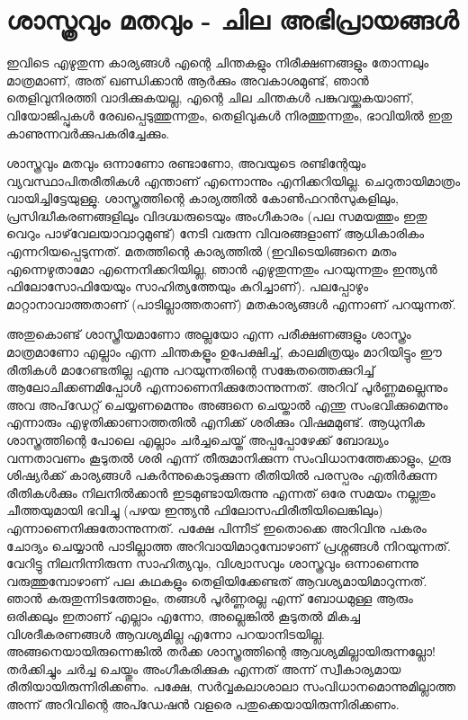 \section*{ശാസ്ത്രവും മതവും - ചില അഭിപ്രായങ്ങള്‍}
\vskip 2pt

ഇവിടെ എഴുതുന്ന കാര്യങ്ങള്‍ എന്റെ ചിന്തകളും നിരീക്ഷണങ്ങളും തോന്നലും മാത്രമാണ്, അത് ഖണ്ഡിക്കാന്‍ ആര്‍ക്കും അവകാശമുണ്ട്, ഞാന്‍ തെളിവുനിരത്തി വാദിക്കുകയല്ല, എന്റെ ചില ചിന്തകള്‍ പങ്കുവയ്ക്കുകയാണ്, വിയോജിപ്പുകള്‍ രേഖപ്പെടുത്തുന്നതും, തെളിവുകള്‍ നിരത്തുന്നതും, ഭാവിയില്‍ ഇതു കാണുന്നവര്‍ക്കുപകരിച്ചേക്കും.

ശാസ്ത്രവും മതവും ഒന്നാണോ രണ്ടാണോ, അവയുടെ രണ്ടിന്റേയും വ്യവസ്ഥാപിതരീതികള്‍ എന്താണ് എന്നൊന്നും എനിക്കറിയില്ല. ചെറുതായിമാത്രം വായിച്ചിട്ടേയുള്ളു. ശാസ്ത്രത്തിന്റെ കാര്യത്തില്‍ കോണ്‍ഫറന്‍സുകളിലും, പ്രസിദ്ധീകരണങ്ങളിലും വിദഗ്ദ്ധരുടെയും അംഗീകാരം (പല സമയത്തും ഇതു വെറും പാഴ്‌വേലയാവാറുമുണ്ട്) നേടി വരുന്ന വിവരങ്ങളാണ് ആധികാരികം എന്നറിയപ്പെടുന്നത്. മതത്തിന്റെ കാര്യത്തില്‍ (ഇവിടെയിങ്ങനെ മതം എന്നെഴുതാമോ എന്നെനിക്കറിയില്ല, ഞാന്‍ എഴുതുന്നതും പറയുന്നതും ഇന്ത്യന്‍ ഫിലോസോഫിയേയും സാഹിത്യത്തേയും കുറിച്ചാണ്). പലപ്പോഴും മാറ്റാനാവാത്തതാണ് (പാടില്ലാത്തതാണ്) മതകാര്യങ്ങള്‍ എന്നാണ് പറയുന്നത്.

അതുകൊണ്ട് ശാസ്ത്രീയമാണോ അല്ലയോ എന്ന പരീക്ഷണങ്ങളും ശാസ്ത്രം മാത്രമാണോ എല്ലാം എന്ന ചിന്തകളൂം ഉപേക്ഷിച്ച്, കാലമിത്രയും മാറിയിട്ടും ഈ രീതികള്‍ മാറേണ്ടതില്ല എന്നു പറയുന്നതിന്റെ സങ്കേതത്തെക്കുറിച്ച് ആലോചിക്കണമിപ്പോള്‍ എന്നാണെനിക്കുതോന്നുന്നത്. അറിവ് പൂര്‍ണ്ണമല്ലെന്നും അവ അപ്‌ഡേറ്റ് ചെയ്യണമെന്നും അങ്ങനെ ചെയ്താല്‍ എന്തു സംഭവിക്കുമെന്നും എന്നാരും എഴുതിക്കാണാത്തതില്‍ എനിക്ക് ശരിക്കും വിഷമമുണ്ട്. ആധുനിക ശാസ്ത്രത്തിന്റെ പോലെ എല്ലാം ചര്‍ച്ചചെയ്ത് അപ്പപ്പോഴേക്ക് ബോദ്ധ്യം വന്നതാവണം കൂടുതല്‍ ശരി എന്ന് തീരുമാനിക്കുന്ന സംവിധാനത്തേക്കാളും, ഗുരു ശിഷ്യര്‍ക്ക് കാര്യങ്ങള്‍ പകര്‍ന്നുകൊടുക്കുന്ന രീതിയില്‍ പരസ്പരം എതിര്‍ക്കുന്ന രീതികള്‍ക്കും നിലനില്‍ക്കാന്‍ ഇടമുണ്ടായിരുന്നു എന്നത് ഒരേ സമയം നല്ലതും ചീത്തയുമായി ഭവിച്ചു (പഴയ ഇന്ത്യന്‍ ഫിലോസഫിരീതിയിലെങ്കിലും) എന്നാണെനിക്കുതോന്നുന്നത്. പക്ഷേ പിന്നീട് ഇതൊക്കെ അറിവിനു പകരം ചോദ്യം ചെയ്യാന്‍ പാടില്ലാത്ത അറിവായിമാറുമ്പോഴാണ് പ്രശ്നങ്ങള്‍ നിറയുന്നത്. വേറിട്ടു നിലനിന്നിരുന്ന സാഹിത്യവും, വിശ്വാസവും ശാസ്ത്രവും ഒന്നാണെന്നു വരുത്തുമ്പോഴാണ് പല കഥകളും തെളിയിക്കേണ്ടത് ആവശ്യമായിമാറുന്നത്. ഞാന്‍ കരുതുന്നിടത്തോളം, തങ്ങള്‍ പൂര്‍ണ്ണരല്ല എന്ന് ബോധമുള്ള ആരും ഒരിക്കലും ഇതാണ് എല്ലാം എന്നോ, അല്ലെങ്കില്‍ കൂടുതല്‍ മികച്ച വിശദീകരണങ്ങള്‍ ആവശ്യമില്ല എന്നോ പറയാനിടയില്ല. അങ്ങനെയായിരുന്നെങ്കില്‍ തര്‍ക്ക ശാസ്ത്രത്തിന്റെ ആവശ്യമില്ലായിരുന്നല്ലോ! തര്‍ക്കിച്ചും ചര്‍ച്ച ചെയ്തും അംഗീകരിക്കുക എന്നത് അന്ന് സ്വീകാര്യമായ രീതിയായിരുന്നിരിക്കണം. പക്ഷേ, സര്‍വ്വകലാശാലാ സംവിധാനമൊന്നുമില്ലാത്ത അന്ന് അറിവിന്റെ അപ്ഡേഷന്‍ വളരെ പതുക്കെയായിരുന്നിരിക്കണം.


